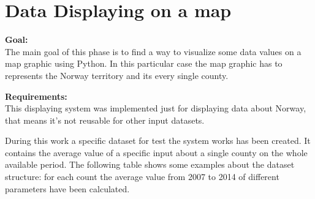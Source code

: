 \newpage

\section{Data Displaying on a map}
\label{Map_displaying}
\textbf{Goal:}\\
The main goal of this phase is to find a way to visualize some data values on a map graphic using Python. In this particular case the map graphic has to represents the Norway territory and its every single county.


\textbf{Requirements:}\\
This displaying system was implemented just for displaying data about Norway, that means it's not reusable for other input datasets.

During this work a specific dataset for test the system works has been created. It contains the average value of a specific input about a single county on the whole available period. The following table shows some examples about the dataset structure: for each count the average value from 2007 to 2014 of different parameters have been calculated.\\

\\
    

